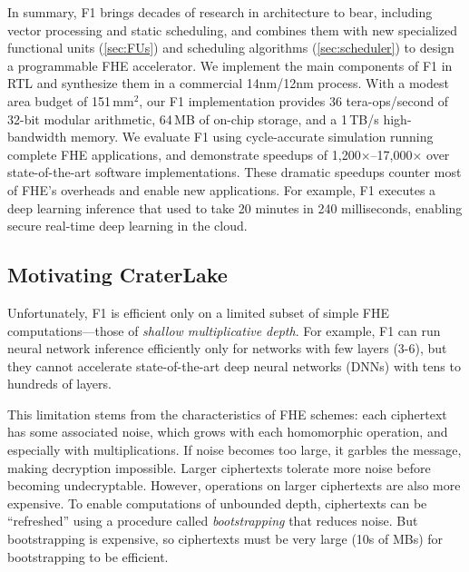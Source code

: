 In summary, F1 brings decades of research in architecture to bear, including vector processing and static scheduling, and combines them with new specialized functional units (\autoref{sec:FUs}) and scheduling algorithms (\autoref{sec:scheduler}) to design a programmable FHE accelerator.
We implement the main components of F1 in RTL and synthesize them in a commercial 14nm/12nm process.
With a modest area budget of 151\,mm$^2$, our F1 implementation 
provides 36 tera-ops/second of 32-bit modular arithmetic, 64\,MB of on-chip storage, and a 1\,TB/s high-bandwidth memory.
We evaluate F1 using cycle-accurate simulation running complete FHE applications,
and demonstrate speedups of 1,200$\times$--17,000$\times$ over state-of-the-art software implementations.
These dramatic speedups counter most of FHE's overheads and enable new applications.
For example, F1 executes a deep learning inference that used to take 20 minutes in 240 milliseconds,
enabling secure real-time deep learning in the cloud.

\subsection{Motivating CraterLake}

Unfortunately, F1 is efficient only on a limited subset of simple FHE
computations---those of \emph{shallow multiplicative depth}.
For example, F1 can run neural network inference efficiently only for networks with few layers (3-6),
but they cannot accelerate state-of-the-art deep neural networks (DNNs) with tens to hundreds of layers.

This limitation stems from the characteristics of FHE schemes:
each ciphertext has some associated noise, which grows with each homomorphic operation, and especially with multiplications.
If noise becomes too large, it garbles the message, making decryption impossible. 
Larger ciphertexts tolerate more noise before becoming undecryptable. 
However, operations on larger ciphertexts are also more expensive.
To enable computations of unbounded depth, ciphertexts can be ``refreshed'' using a procedure called \emph{bootstrapping}
that reduces noise. But bootstrapping is expensive, 
so ciphertexts must be very large (10s of MBs) for bootstrapping to be
efficient.

